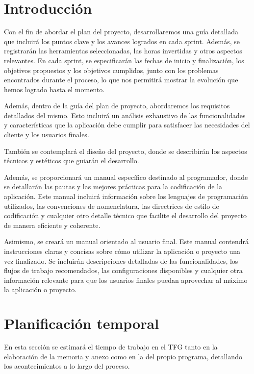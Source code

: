 
\section{Introducción}
Con el fin de abordar el plan del proyecto, desarrollaremos una guía detallada que incluirá los puntos clave y los avances logrados en cada sprint. Además, se registrarán las herramientas seleccionadas, las horas invertidas y otros aspectos relevantes. En cada sprint, se especificarán las fechas de inicio y finalización, los objetivos propuestos y los objetivos cumplidos, junto con los problemas encontrados durante el proceso, lo que nos permitirá mostrar la evolución que hemos logrado hasta el momento.

Además, dentro de la guía del plan de proyecto, abordaremos los requisitos detallados del mismo. Esto incluirá un análisis exhaustivo de las funcionalidades y características que la aplicación debe cumplir para satisfacer las necesidades del cliente y los usuarios finales.

También se contemplará el diseño del proyecto, donde se describirán los aspectos técnicos y estéticos que guiarán el desarrollo.

Además, se proporcionará un manual específico destinado al programador, donde se detallarán las pautas y las mejores prácticas para la codificación de la aplicación. Este manual incluirá información sobre los lenguajes de programación utilizados, las convenciones de nomenclatura, las directrices de estilo de codificación y cualquier otro detalle técnico que facilite el desarrollo del proyecto de manera eficiente y coherente.

Asimismo, se creará un manual orientado al usuario final. Este manual contendrá instrucciones claras y concisas sobre cómo utilizar la aplicación o proyecto una vez finalizado. Se incluirán descripciones detalladas de las funcionalidades, los flujos de trabajo recomendados, las configuraciones disponibles y cualquier otra información relevante para que los usuarios finales puedan aprovechar al máximo la aplicación o proyecto.
\section{Planificación temporal}
En esta sección se estimará el tiempo de trabajo en el TFG tanto en la elaboración de la memoria y anexo como en la del propio programa, detallando los acontecimientos a lo largo del proceso.

